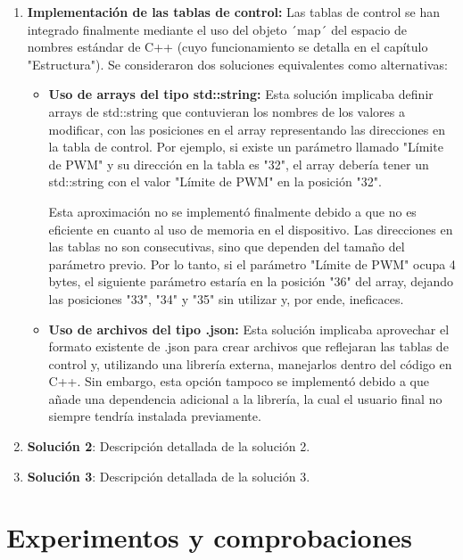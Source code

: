 \documentclass{article}
\begin{document}
\begin{enumerate}
  \item \textbf{Implementación de las tablas de control:} Las tablas de control se han integrado finalmente mediante el uso del objeto ´map´ del espacio de nombres estándar de C++ (cuyo funcionamiento se detalla en el capítulo "Estructura"). Se consideraron dos soluciones equivalentes como alternativas:

  \begin{itemize}
      \item \textbf{Uso de arrays del tipo std::string:} Esta solución implicaba definir arrays de std::string que contuvieran los nombres de los valores a modificar, con las posiciones en el array representando las direcciones en la tabla de control. Por ejemplo, si existe un parámetro llamado "Límite de PWM" y su dirección en la tabla es "32", el array debería tener un std::string con el valor "Límite de PWM" en la posición "32".

      Esta aproximación no se implementó finalmente debido a que no es eficiente en cuanto al uso de memoria en el dispositivo. Las direcciones en las tablas no son consecutivas, sino que dependen del tamaño del parámetro previo. Por lo tanto, si el parámetro "Límite de PWM" ocupa 4 bytes, el siguiente parámetro estaría en la posición "36" del array, dejando las posiciones "33", "34" y "35" sin utilizar y, por ende, ineficaces.

      \item \textbf{Uso de archivos del tipo .json:} Esta solución implicaba aprovechar el formato existente de .json para crear archivos que reflejaran las tablas de control y, utilizando una librería externa, manejarlos dentro del código en C++. Sin embargo, esta opción tampoco se implementó debido a que añade una dependencia adicional a la librería, la cual el usuario final no siempre tendría instalada previamente.
      
  \end{itemize}
  
  \item \textbf{Solución 2}: Descripción detallada de la solución 2.
  
  \item \textbf{Solución 3}: Descripción detallada de la solución 3.
\end{enumerate}

\section{Experimentos y comprobaciones}
\end{document}
